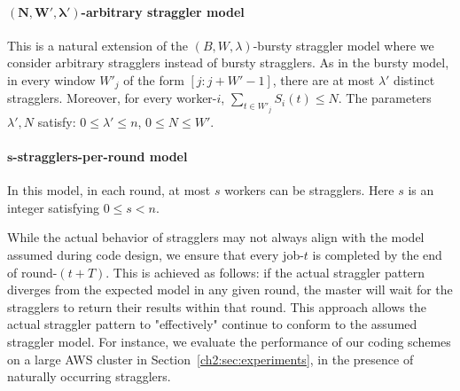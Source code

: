 
\paragraph{$\boldsymbol{(N,W',\lambda')}$-arbitrary straggler model}  This is a natural extension of the $(B,W,\lambda)$-bursty straggler model where we consider arbitrary stragglers instead of bursty stragglers. As in the bursty model, in every window $W'_j$ of the form $[j:j+W'-1]$, there are at most $\lambda'$ distinct stragglers. Moreover, for every worker-$i$, $\sum_{t\in W'_j}S_i(t)\leq N$. The parameters $\lambda',N$ satisfy: $0\leq \lambda'\leq n$, $0\leq N\leq W'$.

\paragraph{$\boldsymbol{s}$-stragglers-per-round model} In this model, in each round, at most $s$ workers can be stragglers. Here $s$ is an integer satisfying $0\leq s<n$. 

\begin{remark}
    \label{ch2:rem:straggler}\normalfont
    
    While the actual behavior of stragglers may not always align with the model assumed during code design, we ensure that every job-$t$ is completed by the end of round-$(t+T)$. This is achieved as follows: if the actual straggler pattern diverges from the expected model in any given round, the master will wait for the stragglers to return their results within that round. This approach allows the actual straggler pattern to "effectively" continue to conform to the assumed straggler model. For instance, we evaluate the performance of our coding schemes on a large AWS cluster in Section~\ref{ch2:sec:experiments}, in the presence of naturally occurring stragglers.
    
\end{remark}


